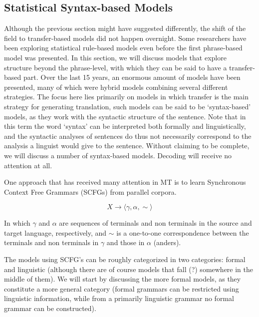 \documentclass{report}
\theoremstyle{definition}
\theoremstyle{plain}
\begin{document}
\subsection{Statistical Syntax-based Models}


Although the previous section might have suggested differently, the shift of the field to transfer-based models did not happen overnight. Some researchers have been exploring statistical rule-based models even before the first phrase-based model was presented. In this section, we will discuss models that explore structure beyond the phrase-level, with which they can be said to have a transfer-based part. Over the last 15 years, an enormous amount of models have been presented, many of which were hybrid models combining several different strategies. The focus here lies primarily on models in which transfer is the main strategy for generating translation, such models can be said to be `syntax-based' models, as they work with the syntactic structure of the sentence. Note that in this term the word `syntax' can be interpreted both formally and linguistically, and the syntactic analyses of sentences do thus not necessarily correspond to the analysis a linguist would give to the sentence. Without claiming to be complete, we will discuss a number of syntax-based models. Decoding will receive no attention at all.


One approach that has received many attention in MT is to learn Synchronous Context Free Grammars (SCFGs) from parallel corpora.

\[
X \to \langle \gamma , \alpha , \sim \rangle
\]

In which $\gamma$ and $\alpha$ are sequences of terminals and non terminals in the source and target language, respectively, and $\sim$ is a one-to-one correspondence between the terminals and non terminals in $\gamma$ and those in $\alpha$ (anders).

The models using SCFG's can be roughly categorized in two categories: formal and linguistic (although there are of course models that fall (?) somewhere in the middle of them). We will start by discussing the more formal models, as they constitute a more general category (formal grammars can be restricted using linguistic information, while from a primarily linguistic grammar no formal grammar can be constructed).
\end{document}
